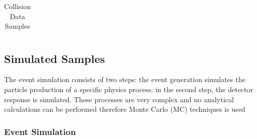 \begin{table}[h]
\begin{center}
\begin{tabular}{| l | c |}
  \end{tabular}                                                                                                                                                                                                       
  \end{center}
  \caption{Collision Data Samples}
  \label{table:datasamples} %
\end{table}


\subsection{Simulated Samples}
\label{subsec:Data}

The event simulation consists of two steps: the event 
generation simulates the particle production of a 
specific physics process; in the second step, the detector response 
is simulated. These processes are very complex and no analytical 
calculations can be performed therefore Monte Carlo (MC) techniques is used





\subsubsection{Event Simulation}
\label{subsubsec:eventSimulation}

